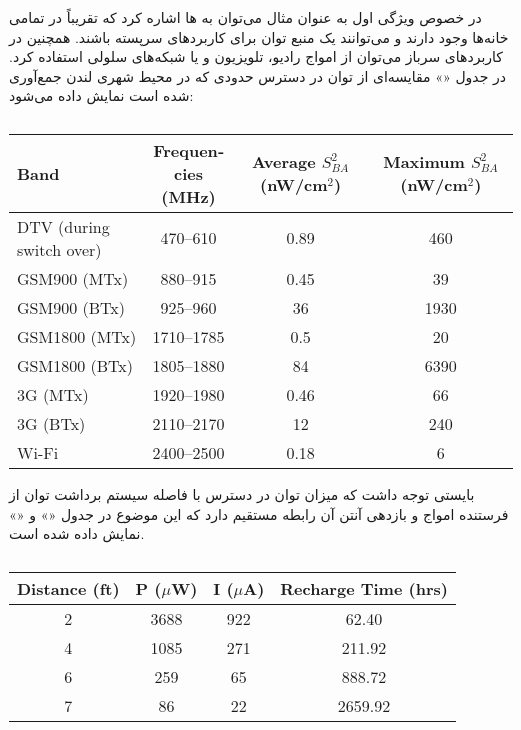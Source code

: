در خصوص ویژگی اول به عنوان مثال می‌توان به  ها اشاره کرد که تقریباً در تمامی خانه‌ها وجود دارند و می‌توانند یک منبع توان برای کاربردهای سرپسته باشند. همچنین در کاربردهای سرباز می‌توان از امواج رادیو، تلویزیون و یا شبکه‌های سلولی استفاده کرد. در جدول «» مقایسه‌ای از توان در دسترس حدودی که در محیط شهری لندن جمع‌آوری شده است نمایش داده می‌شود:

\begin{latin}
\begin{center}
	\begin{table}[h!]
		\centering
		\begin{tabular}{lccc}
			\toprule
			Band & \thead{Frequencies \\ (MHz)} & \thead{Average $S_{BA}^2$ \\ (nW/cm$^2$)} & \thead{Maximum $S_{BA}^2$ \\ (nW/cm$^2$)} \\
			\midrule
			DTV (during switch over) & 470--610 & 0.89 & 460 \\
			GSM900 (MTx) & 880--915 & 0.45 & 39 \\
			GSM900 (BTx) & 925--960 & 36 & 1930 \\
			GSM1800 (MTx) & 1710--1785 & 0.5 & 20 \\
			GSM1800 (BTx) & 1805--1880 & 84 & 6390 \\
			3G (MTx) & 1920--1980 & 0.46 & 66 \\
			3G (BTx) & 2110--2170 & 12 & 240 \\
			Wi-Fi & 2400--2500 & 0.18 & 6 \\
			\bottomrule
		\end{tabular}
		\caption{}
		\label{چگالی انرژی امواج در شهر لندن}
	\end{table}
\end{center} 
\end{latin}



بایستی توجه داشت که میزان توان در دسترس با فاصله سیستم برداشت توان از فرستنده امواج و بازدهی آنتن آن رابطه مستقیم دارد که این موضوع در جدول «» و «» نمایش داده شده است.

\begin{latin}
\begin{center}
	\begin{table}[h!]
		\centering
		\begin{tabular}{cccc}
			\toprule
			Distance (ft) & P ($\mu$W) & I ($\mu$A) & Recharge Time (hrs) \\
			\midrule
			2 & 3688 & 922 & 62.40 \\
			4 & 1085 & 271 & 211.92 \\
			6 & 259 & 65 & 888.72 \\
			7 & 86 & 22 & 2659.92 \\
			\bottomrule
		\end{tabular}
		\caption{}
		\label{تاثیر فاصله بر میزان انرژی آنتن}
	\end{table}
\end{center} 
\end{latin}


